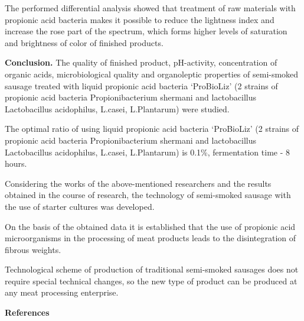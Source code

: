 \begin{multicols}{2}
The performed differential analysis showed that treatment of raw
materials with propionic acid bacteria makes it possible to reduce the
lightness index and increase the rose part of the spectrum, which forms
higher levels of saturation and brightness of color of finished
products.

{\bfseries Conclusion.} The quality of finished product, pH-activity,
concentration of organic acids, microbiological quality and organoleptic
properties of semi-smoked sausage treated with liquid propionic acid
bacteria `ProBioLiz' (2 strains of propionic acid bacteria
Propionibacterium shermani and lactobacillus Lactobacillus acidophilus,
L.casei, L.Plantarum) were studied.

The optimal ratio of using liquid propionic acid bacteria `ProBioLiz' (2
strains of propionic acid bacteria Propionibacterium shermani and
lactobacillus Lactobacillus acidophilus, L.casei, L.Plantarum) is 0.1\%,
fermentation time - 8 hours.

Considering the works of the above-mentioned researchers and the results
obtained in the course of research, the technology of semi-smoked
sausage with the use of starter cultures was developed.

On the basis of the obtained data it is established that the use of
propionic acid microorganisms in the processing of meat products leads
to the disintegration of fibrous weights.

Technological scheme of production of traditional semi-smoked sausages
does not require special technical changes, so the new type of product
can be produced at any meat processing enterprise.
\end{multicols}

\begin{center}
{\bfseries References}
\end{center}

